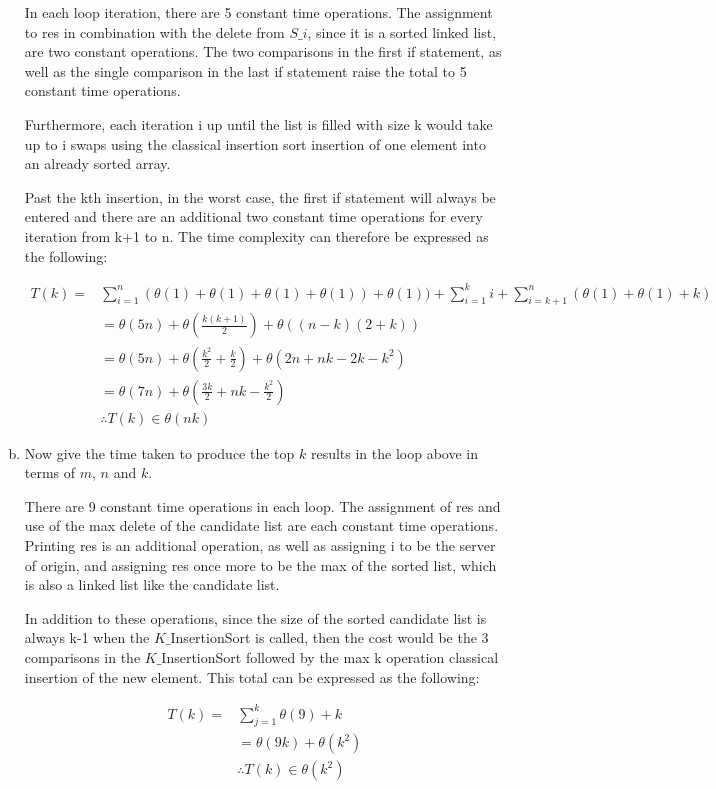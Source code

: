 \documentclass[12pt]{article}
\begin{document}
\begin{enumerate}[(a)]
In each loop iteration, there are 5 constant time operations. The assignment to res in combination with the delete from $S\_i$, since it is a sorted linked list, are two constant operations. The two comparisons in the first if statement, as well as the single comparison in the last if statement raise the total to 5 constant time operations. 

Furthermore, each iteration i up until the list is filled with size k would take up to i swaps using the classical insertion sort insertion of one element into an already sorted array.

Past the kth insertion, in the worst case, the first if statement will always be entered and there are an additional two constant time operations for every iteration from k+1 to n. The time complexity can therefore be expressed as the following:

\begin{align*}
  T(k)=&\sum_{i=1}^n (\theta(1) + \theta(1) + \theta(1) + \theta(1)) + \theta(1)) + \sum_{i=1}^k i + \sum_{i=k+1}^n (\theta(1) + \theta(1) + k)\\
  &= \theta(5n) + \theta(\frac{k(k+1)}{2}) + \theta((n-k)(2 + k))\\
  &= \theta(5n) + \theta(\frac{k^2}{2} + \frac{k}{2}) + \theta(2n + nk -2k - k^2)\\
  &= \theta(7n) + \theta(\frac{3k}{2} + nk - \frac{k^2}{2})\\
  &\therefore T(k) \in \theta(nk)
\end{align*}

\item  Now give the time taken
to produce the top $k$ results in the loop above in terms of $m$, $n$ and $k$.

There are 9 constant time operations in each loop. The assignment of res and use of the max delete of the candidate list are each constant time operations. Printing res is an additional operation, as well as assigning i to be the server of origin, and assigning res once more to be the max of the sorted list, which is also a linked list like the candidate list.

In addition to these operations, since the size of the sorted candidate list is always k-1 when the $K\_$InsertionSort is called, then the cost would be the 3 comparisons in the $K\_$InsertionSort followed by the max k operation classical insertion of the new element. This total can be expressed as the following:

\begin{align*}
  T(k)=&\sum_{j=1}^k \theta(9) + k\\
  &= \theta(9k) + \theta(k^2)\\
  &\therefore T(k) \in \theta(k^2)
\end{align*}


\end{enumerate}
\end{document}
